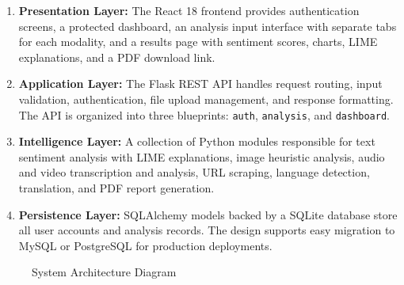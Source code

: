 \documentclass[12pt, a4paper]{report}
\begin{document}
\begin{enumerate}[noitemsep, leftmargin=2em]
    \item \textbf{Presentation Layer:} The React 18 frontend provides authentication screens, a protected dashboard, an analysis input interface with separate tabs for each modality, and a results page with sentiment scores, charts, LIME explanations, and a PDF download link.
    \item \textbf{Application Layer:} The Flask REST API handles request routing, input validation, authentication, file upload management, and response formatting. The API is organized into three blueprints: \texttt{auth}, \texttt{analysis}, and \texttt{dashboard}.
    \item \textbf{Intelligence Layer:} A collection of Python modules responsible for text sentiment analysis with LIME explanations, image heuristic analysis, audio and video transcription and analysis, URL scraping, language detection, translation, and PDF report generation.
    \item \textbf{Persistence Layer:} SQLAlchemy models backed by a SQLite database store all user accounts and analysis records. The design supports easy migration to MySQL or PostgreSQL for production deployments.
\end{enumerate}

\begin{figure}[H]
    \centering
    \caption{System Architecture Diagram}
    \label{fig:system-arch}
\end{figure}
\end{document}

